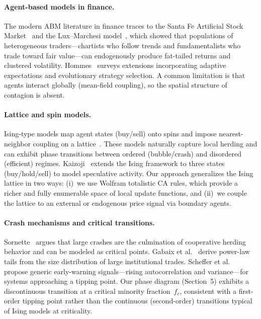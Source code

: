 
\paragraph{Agent-based models in finance.}
The modern ABM literature in finance traces to the Santa Fe Artificial Stock
Market~\cite{lebaron2000agent} and the Lux--Marchesi model~\cite{lux1999scaling}, which
showed that populations of heterogeneous traders---chartists who follow trends and
fundamentalists who trade toward fair value---can endogenously produce fat-tailed returns
and clustered volatility. Hommes~\cite{hommes2006heterogeneous} surveys extensions
incorporating adaptive expectations and evolutionary strategy selection. A common
limitation is that agents interact globally (mean-field coupling), so the spatial
structure of contagion is absent.

\paragraph{Lattice and spin models.}
Ising-type models map agent states (buy/sell) onto spins and impose nearest-neighbor
coupling on a lattice~\cite{stauffer2000generalization,chowdhury2000statistical}.
These models naturally capture local herding and can exhibit phase transitions between
ordered (bubble/crash) and disordered (efficient) regimes. Kaizoji~\cite{kaizoji2002speculative}
extends the Ising framework to three states (buy/hold/sell) to model speculative
activity. Our approach generalizes the Ising lattice in two ways: (i)~we use
Wolfram totalistic CA rules, which provide a richer and fully enumerable space of
local update functions, and (ii)~we couple the lattice to an external or endogenous
price signal via boundary agents.

\paragraph{Crash mechanisms and critical transitions.}
Sornette~\cite{sornette2017why} argues that large crashes are the culmination of
cooperative herding behavior and can be modeled as critical points. Gabaix et
al.~\cite{gabaix2003theory} derive power-law tails from the size distribution of
large institutional trades. Scheffer et al.~\cite{scheffer2009early} propose generic
early-warning signals---rising autocorrelation and variance---for systems approaching
a tipping point. Our phase diagram (Section~5) exhibits a discontinuous transition
at a critical minority fraction~$f_c$, consistent with a first-order tipping point
rather than the continuous (second-order) transitions typical of Ising models at
criticality.


